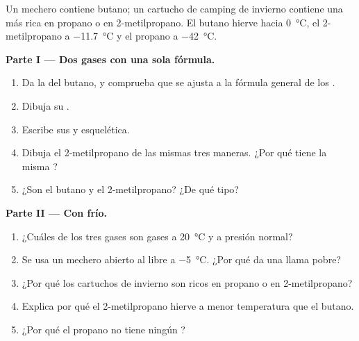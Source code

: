 \begin{problem}
\label{pb:g11:organic-skeletons:1}
Un mechero contiene butano; un cartucho de camping de invierno contiene
una  más rica en propano o en 2-metilpropano. El butano hierve
hacia \qty{0}{\celsius}, el 2-metilpropano a \qty{-11.7}{\celsius} y el
propano a \qty{-42}{\celsius}.

\medskip
\noindent\textbf{Parte I --- Dos gases con una sola fórmula.}
\begin{enumerate}
  \item Da la  del butano, y comprueba que se ajusta a
        la fórmula general de los .
  \item Dibuja su .
  \item Escribe sus  y esquelética.
  \item Dibuja el 2-metilpropano de las mismas tres maneras. ¿Por qué
        tiene la misma ?
  \item ¿Son  el butano y el 2-metilpropano? ¿De qué tipo?
\end{enumerate}

\medskip
\noindent\textbf{Parte II --- Con frío.}
\begin{enumerate}[resume]
  \item ¿Cuáles de los tres gases son gases a \qty{20}{\celsius} y a
        presión normal?
  \item Se usa un mechero abierto al  libre a \qty{-5}{\celsius}.
        ¿Por qué da una llama pobre?
  \item ¿Por qué los cartuchos de invierno son ricos en propano o en
        2-metilpropano?
  \item Explica por qué el 2-metilpropano hierve a menor temperatura que
        el butano.
  \item ¿Por qué el propano no tiene ningún ?
\end{enumerate}


\end{problem}
